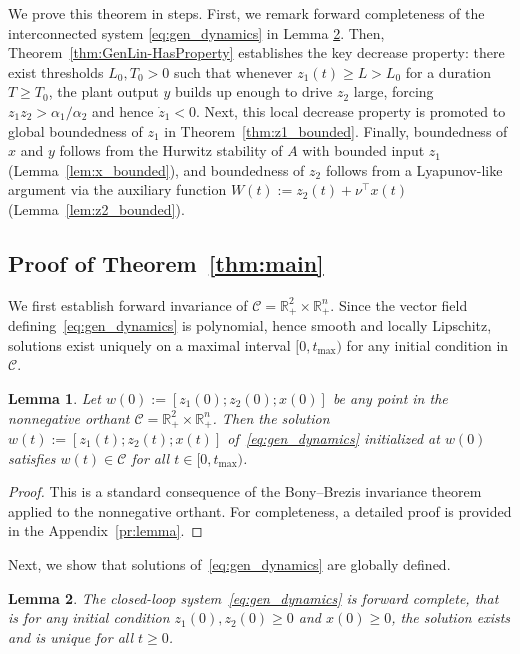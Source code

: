 \documentclass{article}
\newtheorem{lemma}{Lemma}
\begin{document}
We prove this theorem in steps. First, we remark forward completeness of the interconnected system \eqref{eq:gen_dynamics} in Lemma \ref{lem:GenLin-ExSol}. Then, Theorem~\ref{thm:GenLin-HasProperty} 
establishes the key decrease property: there exist thresholds $L_0,T_0>0$ such 
that whenever $z_1(t)\ge L>L_0$ for a duration $T\ge T_0$, the plant output 
$y$ builds up enough to drive $z_2$ large, forcing $z_1 z_2>\alpha_1/\alpha_2$ 
and hence $\dot z_1<0$. Next, this local decrease property is promoted to 
global boundedness of $z_1$ in Theorem~\ref{thm:z1_bounded}. Finally, 
boundedness of $x$ and $y$ follows from the Hurwitz stability of $A$ with 
bounded input $z_1$ (Lemma~\ref{lem:x_bounded}), and boundedness of 
$z_2$ follows from a Lyapunov-like argument via the auxiliary function 
$W(t):=z_2(t)+\nu^\top x(t)$ (Lemma~\ref{lem:z2_bounded}).

\subsection{Proof of Theorem~\ref{thm:main}}

We first establish forward invariance of $\mathcal{C}= \mathbb{R}^2_+ \times 
\mathbb{R}^n_+$. Since the vector field defining~\eqref{eq:gen_dynamics} is 
polynomial, hence smooth and locally Lipschitz, solutions exist uniquely on 
a maximal interval $[0,t_{\max})$ for any initial condition in $\mathcal{C}$.

\begin{lemma}\label{lem:GenLin-OctInv}
    Let $w(0):=[z_1(0);z_2(0);x(0)]$ be any point in the nonnegative orthant $\mathcal{C}= \mathbb{R}^2_+ \times \mathbb{R}^n_+$. Then the solution $w(t):=[z_1(t);z_2(t);x(t)]$ of~\eqref{eq:gen_dynamics} initialized at $w(0)$
    satisfies $w(t)\in\mathcal{C}$ for all $t\in[0,t_{\max})$.
\end{lemma}

\begin{proof}
    This is a standard consequence of the Bony--Brezis invariance theorem 
    applied to the nonnegative orthant. For completeness, 
    a detailed proof is provided in the Appendix~\ref{pr:lemma}.
\end{proof}

Next, we show that solutions of~\eqref{eq:gen_dynamics} are globally defined.

\begin{lemma}\label{lem:GenLin-ExSol}
    The closed-loop system~\eqref{eq:gen_dynamics} is forward complete, that is for any 
    initial condition $z_1(0),z_2(0)\ge 0$ and $x(0)\ge 0$, the solution exists 
    and is unique for all $t\ge 0$.
\end{lemma}
\end{document}
